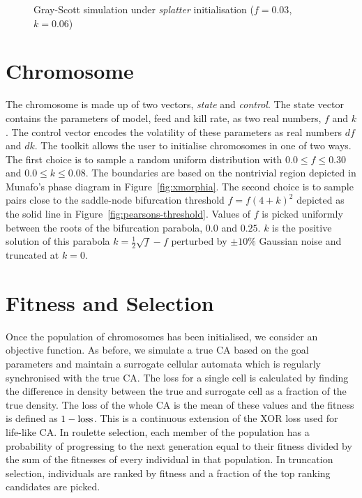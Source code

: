 \begin{figure}[!h]
            \hfill
            \caption{Gray-Scott simulation under \textit{splatter} initialisation ($f = 0.03$, $k = 0.06$)}
\label{fig:splatter}
\end{figure}

\section{Chromosome}
The chromosome is made up of two vectors, \textit{state} and \textit{control}. The state vector contains the parameters of model, feed and kill rate, as two real numbers, $f$ and $k$. The control vector encodes the volatility of these parameters as real numbers $df$ and $dk$. The toolkit allows the user to initialise chromosomes in one of two ways. The first choice is to sample a random uniform distribution with $0.0 \leq f \leq 0.30$ and $0.0 \leq k \leq 0.08$. The boundaries are based on the nontrivial region depicted in Munafo's phase diagram in Figure~\ref{fig:xmorphia}. The second choice is to sample pairs close to the saddle-node bifurcation threshold $f = f(4+k)^2$ depicted as the solid line in Figure~\ref{fig:pearsons-threshold}. Values of $f$ is picked uniformly between the roots of the bifurcation parabola, $0.0$ and $0.25$. $k$ is the positive solution of this parabola $k = \frac{1}{2}\sqrt{f} - f$ perturbed by $\pm 10\%$ Gaussian noise and truncated at $k = 0$.

\section{Fitness and Selection}
Once the population of chromosomes has been initialised, we consider an objective function. As before, we simulate a true CA based on the goal parameters and maintain a surrogate cellular automata which is regularly synchronised with the true CA. The loss for a single cell is calculated by finding the difference in density between the true and surrogate cell as a fraction of the true density. The loss of the whole CA is the mean of these values and the fitness is defined as $1 - \textnormal{loss}$. This is a continuous extension of the XOR loss used for life-like CA. In roulette selection, each member of the population has a probability of progressing to the next generation equal to their fitness divided by the sum of the fitnesses of every individual in that population. In truncation selection, individuals are ranked by fitness and a fraction of the top ranking candidates are picked.\\

